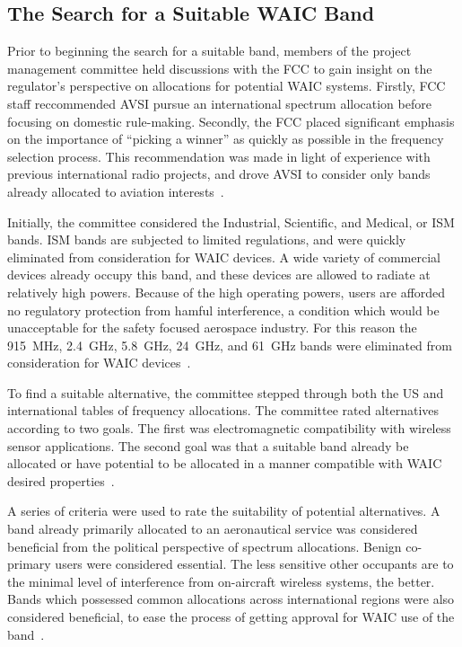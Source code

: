 \subsection{The Search for a Suitable WAIC Band}
Prior to beginning the search for a suitable band, members of the project management committee held discussions with the FCC to gain insight on the regulator's perspective on allocations for potential WAIC systems. Firstly, FCC staff reccommended AVSI pursue an international spectrum allocation before focusing on domestic rule-making. Secondly, the FCC placed significant emphasis on the importance of  ``picking a winner'' as quickly as possible in the frequency selection process. This recommendation was made in light of experience with previous international radio projects, and drove AVSI to consider only bands already allocated to aviation interests~\cite{ferrell_feasibility_2007}.    
 
Initially, the committee considered the Industrial, Scientific, and Medical, or ISM bands. ISM bands are subjected to limited regulations, and were quickly eliminated from consideration for WAIC devices. A wide variety of commercial devices already occupy this band, and these devices are allowed to radiate at relatively high powers. Because of the high operating powers, users are afforded no regulatory protection from hamful interference, a condition which would be unacceptable for the safety focused aerospace industry. For this reason the 915~MHz, 2.4~GHz, 5.8~GHz, 24~GHz, and 61~GHz bands were eliminated from consideration for WAIC devices~\cite{ferrell_feasibility_2007}. 


To find a suitable alternative, the committee stepped through both the US and international tables of frequency allocations. The committee rated alternatives according to two goals. The first was electromagnetic compatibility with wireless sensor applications. The second goal was that a suitable band already be allocated or have potential to be allocated in a manner compatible with WAIC desired properties~\cite{ferrell_feasibility_2007}. 

A series of criteria were used to rate the suitability of potential alternatives. A band already primarily allocated to an aeronautical service was considered beneficial from the political perspective of spectrum allocations. Benign co-primary users were considered essential. The less sensitive other occupants are to the minimal level of interference from on-aircraft wireless systems, the better. Bands which possessed common allocations across international regions were also considered beneficial, to ease the process of getting approval for WAIC use of the band~\cite{ferrell_feasibility_2007}. 

